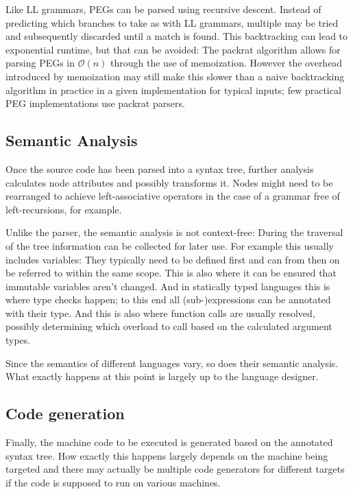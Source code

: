 			Like LL grammars, PEGs can be parsed using recursive descent. Instead of predicting which branches to take as with LL grammars, multiple may be tried and subsequently discarded until a match is found. This backtracking can lead to exponential runtime, but that can be avoided: The packrat algorithm\cite{packrat} allows for parsing PEGs in $\mathcal{O}(n)$ through the use of memoization. However the overhead introduced by memoization may still make this slower than a naive backtracking algorithm in practice in a given implementation for typical inputs; few practical PEG implementations use packrat parsers.
			
		\subsection{Semantic Analysis}
		
		Once the source code has been parsed into a syntax tree, further analysis calculates node attributes and possibly transforms it. Nodes might need to be rearranged to achieve left-associative operators in the case of a grammar free of left-recursions, for example.
		
		Unlike the parser, the semantic analysis is not context-free: During the traversal of the tree information can be collected for later use. For example this usually includes variables: They typically need to be defined first and can from then on be referred to within the same scope. This is also where it can be ensured that immutable variables aren't changed. And in statically typed languages this is where type checks happen; to this end all (sub-)expressions can be annotated with their type. And this is also where function calls are usually resolved, possibly determining which overload to call based on the calculated argument types.
		
		Since the semantics of different languages vary, so does their semantic analysis. What exactly happens at this point is largely up to the language designer.
		
		
		\subsection{Code generation}
		
		Finally, the machine code to be executed is generated based on the annotated syntax tree. How exactly this happens largely depends on the machine being targeted and there may actually be multiple code generators for different targets if the code is supposed to run on various machines.
		
